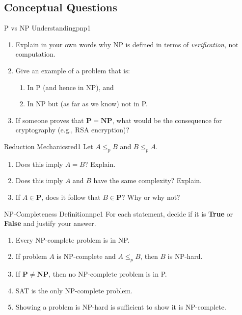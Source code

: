 \documentclass[12pt,a4paper]{article}
\newcommand{\P}{\mathbf{P}}
\newcommand{\NP}{\mathbf{NP}}
\newcommand{\leqp}{\leq_p}
\begin{document}
\subsection{Conceptual Questions}

\begin{exercise}{P vs NP Understanding}{pnp1}
\begin{enumerate}[label=(\alph*),leftmargin=2em]
  \item Explain in your own words why NP is defined in terms of \emph{verification}, not computation.
  \item Give an example of a problem that is:
    \begin{enumerate}[label=(\roman*)]
      \item In P (and hence in NP), and
      \item In NP but (as far as we know) not in P.
    \end{enumerate}
  \item If someone proves that $\P = \NP$, what would be the consequence for cryptography (e.g., RSA encryption)?
\end{enumerate}
\end{exercise}

\begin{exercise}{Reduction Mechanics}{red1}
Let $A \leqp B$ and $B \leqp A$.
\begin{enumerate}[label=(\alph*),leftmargin=2em]
  \item Does this imply $A = B$? Explain.
  \item Does this imply $A$ and $B$ have the same complexity? Explain.
  \item If $A \in \P$, does it follow that $B \in \P$? Why or why not?
\end{enumerate}
\end{exercise}

\begin{exercise}{NP-Completeness Definition}{npc1}
For each statement, decide if it is \textbf{True} or \textbf{False} and justify your answer.
\begin{enumerate}[label=(\alph*),leftmargin=2em]
  \item Every NP-complete problem is in NP.
  \item If problem $A$ is NP-complete and $A \leqp B$, then $B$ is NP-hard.
  \item If $\P \neq \NP$, then no NP-complete problem is in P.
  \item SAT is the only NP-complete problem.
  \item Showing a problem is NP-hard is sufficient to show it is NP-complete.
\end{enumerate}
\end{exercise}
\end{document}
